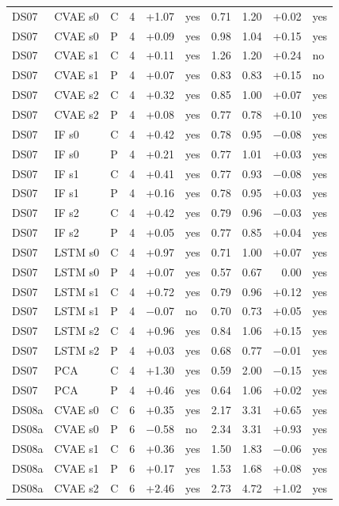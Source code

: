 \documentclass[10pt]{article}
\begin{document}
{\begin{longtable}{lllrrlrrrl}
\midrule
DS07 & CVAE s0 & C & 4 & +1.07 & yes & 0.71 & 1.20 & +0.02 & yes \\
DS07 & CVAE s0 & P & 4 & +0.09 & yes & 0.98 & 1.04 & +0.15 & yes \\
DS07 & CVAE s1 & C & 4 & +0.11 & yes & 1.26 & 1.20 & +0.24 & no \\
DS07 & CVAE s1 & P & 4 & +0.07 & yes & 0.83 & 0.83 & +0.15 & no \\
DS07 & CVAE s2 & C & 4 & +0.32 & yes & 0.85 & 1.00 & +0.07 & yes \\
DS07 & CVAE s2 & P & 4 & +0.08 & yes & 0.77 & 0.78 & +0.10 & yes \\
DS07 & IF s0 & C & 4 & +0.42 & yes & 0.78 & 0.95 & −0.08 & yes \\
DS07 & IF s0 & P & 4 & +0.21 & yes & 0.77 & 1.01 & +0.03 & yes \\
DS07 & IF s1 & C & 4 & +0.41 & yes & 0.77 & 0.93 & −0.08 & yes \\
DS07 & IF s1 & P & 4 & +0.16 & yes & 0.78 & 0.95 & +0.03 & yes \\
DS07 & IF s2 & C & 4 & +0.42 & yes & 0.79 & 0.96 & −0.03 & yes \\
DS07 & IF s2 & P & 4 & +0.05 & yes & 0.77 & 0.85 & +0.04 & yes \\
DS07 & LSTM s0 & C & 4 & +0.97 & yes & 0.71 & 1.00 & +0.07 & yes \\
DS07 & LSTM s0 & P & 4 & +0.07 & yes & 0.57 & 0.67 & 0.00 & yes \\
DS07 & LSTM s1 & C & 4 & +0.72 & yes & 0.79 & 0.96 & +0.12 & yes \\
DS07 & LSTM s1 & P & 4 & −0.07 & no & 0.70 & 0.73 & +0.05 & yes \\
DS07 & LSTM s2 & C & 4 & +0.96 & yes & 0.84 & 1.06 & +0.15 & yes \\
DS07 & LSTM s2 & P & 4 & +0.03 & yes & 0.68 & 0.77 & −0.01 & yes \\
DS07 & PCA & C & 4 & +1.30 & yes & 0.59 & 2.00 & −0.15 & yes \\
DS07 & PCA & P & 4 & +0.46 & yes & 0.64 & 1.06 & +0.02 & yes \\
\midrule
DS08a & CVAE s0 & C & 6 & +0.35 & yes & 2.17 & 3.31 & +0.65 & yes \\
DS08a & CVAE s0 & P & 6 & −0.58 & no & 2.34 & 3.31 & +0.93 & yes \\
DS08a & CVAE s1 & C & 6 & +0.36 & yes & 1.50 & 1.83 & −0.06 & yes \\
DS08a & CVAE s1 & P & 6 & +0.17 & yes & 1.53 & 1.68 & +0.08 & yes \\
DS08a & CVAE s2 & C & 6 & +2.46 & yes & 2.73 & 4.72 & +1.02 & yes \\

\end{longtable}}
\end{document}
